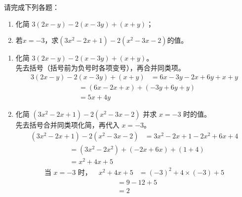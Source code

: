 \documentclass[12pt,a4paper,fontset=none]{exam-zh}
\begin{document}
\begin{question}[points = 10]
    请完成下列各题：

    \begin{enumerate}[label=(\alph*)]
        \item 化简 $3(2x-y) - 2(x-3y) + (x+y)$；

        \item 若$x = -3$，求$(3x^2 - 2x + 1) - 2(x^2 - 3x - 2)$的值。

    \end{enumerate}
\end{question}

\begin{solution}
    \begin{enumerate}[label=(\alph*)]
        \item 化简 $3(2x-y) - 2(x-3y) + (x+y)$。 \\
        先去括号（括号前为负号时各项变号），再合并同类项。 \\
        \begin{align*}
            3(2x-y) - 2(x-3y) + (x+y) &= 6x - 3y - 2x + 6y + x + y
        \end{align*}
        \begin{align*}
            &= (6x - 2x + x) + (-3y + 6y + y) \\
            &= 5x + 4y
        \end{align*}

        \item 化简 $(3x^2 - 2x + 1) - 2(x^2 - 3x - 2)$ 并求 $x=-3$ 时的值。 \\
        先去括号合并同类项化简，再代入 $x=-3$。 \\
        \begin{align*}
            (3x^2 - 2x + 1) - 2(x^2 - 3x - 2) &= 3x^2 - 2x + 1 - 2x^2 + 6x + 4
        \end{align*}
        \begin{align*}
            &= (3x^2 - 2x^2) + (-2x + 6x) + (1 + 4) \\
            &= x^2 + 4x + 5
        \end{align*}
        \begin{align*}
            \text{当 } x = -3 \text{ 时，}\quad x^2 + 4x + 5 &= (-3)^2 + 4\times(-3) + 5
        \end{align*}
        \begin{align*}
            &= 9 - 12 + 5 \\
            &= 2
        \end{align*}


\end{enumerate}
\end{solution}
\end{document}
